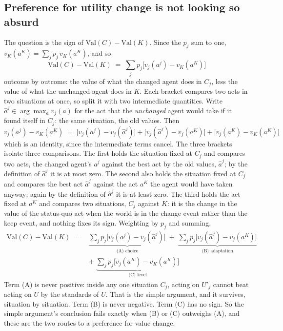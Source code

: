 \documentclass[11pt,a4paper]{article}
\begin{document}
\subsection{Preference for utility change is not looking so absurd}
The question is the sign of $\mathrm{Val}(C) - \mathrm{Val}(K)$. Since the $p_j$ sum to one, $v_K(a^K) = \sum_j p_j\, v_K(a^K)$, and so
\[
\mathrm{Val}(C) - \mathrm{Val}(K) \;=\; \sum_j p_j \bigl[ v_j(a^j) - v_K(a^K)\bigr]
\]
outcome by outcome: the value of what the changed agent does in $C_j$, less the value of what the unchanged agent does in $K$. Each bracket compares two acts in two situations at once, so split it with two intermediate quantities. Write $\hat a^j \in \arg\max_a v_j(a)$ for the act that the \emph{unchanged} agent would take if it found itself in $C_j$: the same situation, the old values. Then
\[
v_j(a^j) - v_K(a^K) \;=\; \bigl[ v_j(a^j) - v_j(\hat a^j)\bigr] + \bigl[ v_j(\hat a^j) - v_j(a^K)\bigr] + \bigl[ v_j(a^K) - v_K(a^K)\bigr]
\]
which is an identity, since the intermediate terms cancel. The three brackets isolate three comparisons. The first holds the situation fixed at $C_j$ and compares two acts, the changed agent's $a^j$ against the best act by the old values, $\hat a^j$; by the definition of $\hat a^j$ it is at most zero. The second also holds the situation fixed at $C_j$ and compares the best act $\hat a^j$ against the act $a^K$ the agent would have taken anyway; again by the definition of $\hat a^j$ it is at least zero. The third holds the act fixed at $a^K$ and compares two situations, $C_j$ against $K$: it is the change in the value of the status-quo act when the world is in the change event rather than the keep event, and nothing fixes its sign. Weighting by $p_j$ and summing,
\begin{align*}
\mathrm{Val}(C) - \mathrm{Val}(K) \;=\;& \underbrace{\sum_j p_j \bigl[ v_j(a^j) - v_j(\hat a^j)\bigr]}_{\text{(A) choice}} \;+\; \underbrace{\sum_j p_j \bigl[ v_j(\hat a^j) - v_j(a^K)\bigr]}_{\text{(B) adaptation}} \\
&+\; \underbrace{\sum_j p_j \bigl[ v_j(a^K) - v_K(a^K)\bigr]}_{\text{(C) level}}
\end{align*}
Term (A) is never positive: inside any one situation $C_j$, acting on $U'_j$ cannot beat acting on $U$ by the standards of $U$. That is the simple argument, and it survives, situation by situation. Term (B) is never negative. Term (C) has no sign. So the simple argument's conclusion fails exactly when (B) or (C) outweighs (A), and these are the two routes to a preference for value change.
\end{document}
